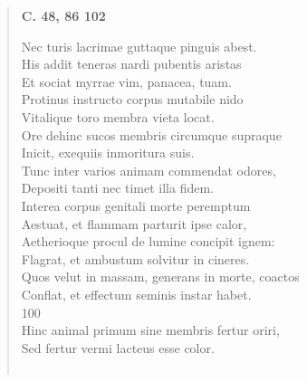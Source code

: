 \documentclass[11pt, a4paper]{report}
\begin{document}
\begin{verse}
    \begin{center} \textbf{C. 48, 86 102} \end{center} \marginpar{[24]} Nec turis lacrimae guttaque pinguis abest. \\ His addit teneras nardi pubentis aristas \\ Et sociat myrrae vim, panacea, tuam. \\ Protinus instructo corpus mutabile nido \\ Vitalique toro membra vieta locat. \\ Ore dehinc sucos membris circumque supraque \\ Inicit, exequiis inmoritura suis. \\ Tunc inter varios animam commendat odores, \\ Depositi tanti nec timet illa fidem. \\ Interea corpus genitali morte peremptum \\ Aestuat, et flammam parturit ipse calor, \\ Aetherioque procul de lumine concipit ignem: \\ Flagrat, et ambustum solvitur in cineres. \\ Quos velut in massam, generans in morte, coactos \\ Conflat, et effectum seminis instar habet. \\ 100 \\ Hinc animal primum sine membris fertur oriri, \\ Sed fertur vermi lacteus esse color. \\ 
        ﻿\pagebreak 

\end{verse}
\end{document}
